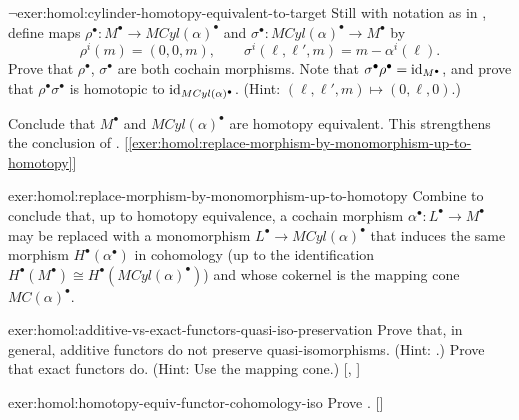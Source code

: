 \begin{exer}{$\lnot$}{exer:homol:cylinder-homotopy-equivalent-to-target}
  Still with notation as in
  , define maps
  $\rho^\bullet : M^\bullet \to MCyl(\alpha)^\bullet$ and
  $\sigma^\bullet : MCyl(\alpha)^\bullet \to M^\bullet$ by
  \[
    \rho^i(m) = (0, 0, m), \qquad \sigma^i(\ell, \ell', m) = m -
    \alpha^i(\ell).
  \]
  Prove that $\rho^\bullet$, $\sigma^\bullet$ are both cochain
  morphisms. Note that
  $\sigma^\bullet \rho^\bullet = \operatorname{id}_{M^\bullet}$, and prove that
  $\rho^\bullet \sigma^\bullet$ is homotopic to
  $\operatorname{id}_{MCyl(\alpha)^\bullet}$. (Hint:
  $(\ell, \ell', m) \mapsto (0, \ell, 0)$.)

  Conclude that $M^\bullet$ and $MCyl(\alpha)^\bullet$ are homotopy
  equivalent. This strengthens the conclusion of
  .
  [\ref{exer:homol:replace-morphism-by-monomorphism-up-to-homotopy}]
\end{exer}
\begin{exer}{}{exer:homol:replace-morphism-by-monomorphism-up-to-homotopy}
  Combine
  to conclude that, up to
  homotopy equivalence, a cochain morphism
  $\alpha^\bullet : L^\bullet \to M^\bullet$ may be replaced with a
  monomorphism $L^\bullet \to MCyl(\alpha)^\bullet$ that induces the
  same morphism $H^\bullet(\alpha^\bullet)$ in cohomology (up to the
  identification
  $H^\bullet(M^\bullet) \cong H^\bullet(MCyl(\alpha)^\bullet)$) and
  whose cokernel is the mapping cone $MC(\alpha)^\bullet$.
\end{exer}
\begin{exer}{\exerused{}}{exer:homol:additive-vs-exact-functors-quasi-iso-preservation}
  Prove that, in general, additive functors do not preserve
  quasi-isomorphisms. (Hint: .) Prove that exact
  functors do. (Hint: Use the mapping cone.)
  [,
  ]
\end{exer}
\begin{exer}{\exerused{}}{exer:homol:homotopy-equiv-functor-cohomology-iso}
  Prove . []
\end{exer}

